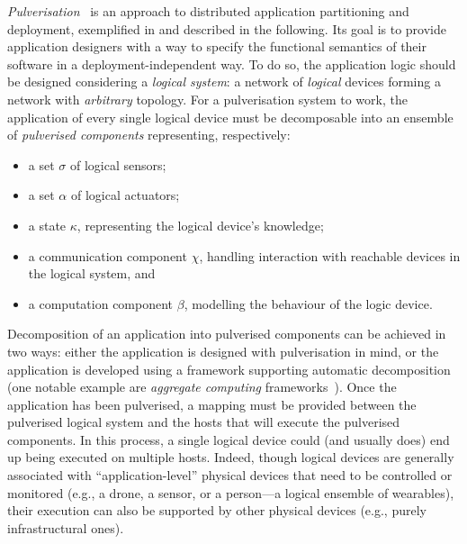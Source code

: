 \documentclass[conference]{IEEEtran}
\begin{document}
\emph{Pulverisation}~\cite{FI2020-pulverization,IEEE-IoTJ-pulverization-simulation}
 is an approach to distributed application partitioning
 and deployment, exemplified in  and described in the following.
%
Its goal 
 is to provide application designers with a way to specify the functional semantics of their software in a deployment-independent way.
%
To do so,
the application logic should be designed considering a \emph{logical system}:
a network of \emph{logical} devices forming a network with \emph{arbitrary} topology.
%
For a pulverisation system to work,
the application of every single logical device must be decomposable into an ensemble of \emph{pulverised components}
representing, respectively:
\begin{itemize}
    \item a set $\sigma$ of logical sensors;
    \item a set $\alpha$ of logical actuators;
    \item a state $\kappa$, representing the logical device's knowledge;
    \item a communication component $\chi$,
    handling interaction with reachable devices in the logical system, and
    \item a computation component $\beta$, modelling the behaviour of the logic device.
\end{itemize}
%
Decomposition of an application into pulverised components can be achieved in two ways:
either the application is designed with pulverisation in mind,
or the application is developed using a framework supporting automatic decomposition
(one notable example are \emph{aggregate computing} frameworks~\cite{BealIEEEComputer2015,JLAMP2019}).
%
Once the application has been pulverised,
a mapping must be provided between the pulverised logical system and the hosts that will execute the pulverised components.
%
In this process,
a single logical device could (and usually does) end up being executed on multiple hosts.
%
Indeed, though logical devices are generally associated with ``application-level'' physical devices that need to be controlled or monitored
(e.g., a drone, a sensor, or a person---a logical ensemble of wearables),
their execution can also be supported by other physical devices
(e.g., purely infrastructural ones).
\end{document}
